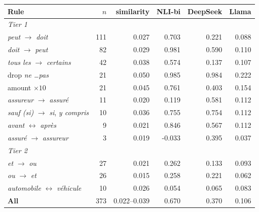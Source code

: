 \setlength{\tabcolsep}{3.5pt}
\begin{tabular}{lrrrrr}
\toprule
Rule & $n$ & similarity & NLI-bi & DeepSeek & Llama \\
\midrule
\multicolumn{6}{l}{\emph{Tier 1}} \\
\emph{peut} $\rightarrow$ \emph{doit} & 111 & 0.027 & 0.703 & 0.221 & 0.088 \\
\emph{doit} $\rightarrow$ \emph{peut} & 82 & 0.029 & 0.981 & 0.590 & 0.110 \\
\emph{tous les} $\rightarrow$ \emph{certains} & 42 & 0.038 & 0.574 & 0.137 & 0.107 \\
drop \emph{ne \dots pas} & 21 & 0.050 & 0.985 & 0.984 & 0.222 \\
amount $\times 10$ & 21 & 0.045 & 0.761 & 0.403 & 0.154 \\
\emph{assureur} $\rightarrow$ \emph{assur\'e} & 11 & 0.020 & 0.119 & 0.581 & 0.112 \\
\emph{sauf (si)} $\rightarrow$ \emph{si}, \emph{y compris} & 10 & 0.036 & 0.755 & 0.754 & 0.112 \\
\emph{avant} $\leftrightarrow$ \emph{apr\`es} & 9 & 0.021 & 0.846 & 0.567 & 0.112 \\
\emph{assur\'e} $\rightarrow$ \emph{assureur} & 3 & 0.019 & -0.033 & 0.395 & 0.037 \\
\midrule
\multicolumn{6}{l}{\emph{Tier 2}} \\
\emph{et} $\rightarrow$ \emph{ou} & 27 & 0.021 & 0.262 & 0.133 & 0.093 \\
\emph{ou} $\rightarrow$ \emph{et} & 26 & 0.015 & 0.258 & 0.221 & 0.062 \\
\emph{automobile} $\leftrightarrow$ \emph{v\'ehicule} & 10 & 0.026 & 0.054 & 0.065 & 0.083 \\
\midrule
\textbf{All} & 373 & 0.022--0.039 & 0.670 & 0.370 & 0.106 \\
\bottomrule
\end{tabular}
